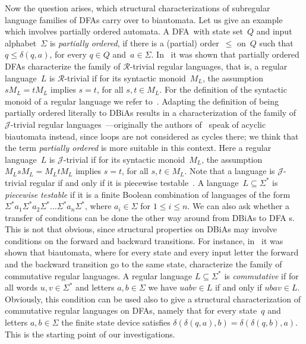\documentclass[submission]{eptcs}
\newcommand{\dfa}{\textrm{DFA}}
\newcommand{\dbia}{\textrm{DBiA}}
\begin{document}
Now the question arises, which structural characterizations of
subregular language families of \dfa s carry over to biautomata. Let
us give an example which involves partially ordered automata. A \dfa\
with state set~$Q$ and input alphabet~$\Sigma$ is \emph{partially
  ordered}, if there is a (partial) order~$\leq$ on~$Q$ such that
$q\leq \delta(q,a)$, for every $q\in Q$
and~$a\in\Sigma$. In~\cite{BrFi80} it was shown that partially ordered
\dfa s characterize the family of $\mathcal{R}$-trivial regular
languages, that is, a regular language~$L$ is $\mathcal{R}$-trivial if
for its syntactic monoid~$M_L$, the assumption $sM_L=tM_L$ implies
$s=t$, for all $s,t\in M_L$. For the definition of the syntactic
monoid of a regular language we refer to~\cite{Ar69}. Adapting the
definition of being partially ordered literally to \dbia s results in
a characterization of the family of $\mathcal{J}$-trivial regular
languages~\cite{KlPo12a,KlPo12}---originally the authors
of~\cite{KlPo12} speak of acyclic biautomata instead, since loops are
not considered as cycles there; we think that the term \emph{partially
  ordered} is more suitable in this context. Here a regular
language~$L$ is $\mathcal{J}$-trivial if for its syntactic
monoid~$M_L$, the assumption $M_LsM_L=M_LtM_L$ implies $s=t$, for all
$s,t\in M_L$. Note that a language is $\mathcal{J}$-trivial regular if
and only if it is piecewise testable~\cite{Si75}. A
language~$L\subseteq\Sigma^*$ is \emph{piecewise testable} if it is a
finite Boolean combination of languages of the form
$\Sigma^*a_1\Sigma^*a_2\Sigma^*\ldots\Sigma^*a_n\Sigma^*$, where
$a_i\in\Sigma$ for $1\leq i\leq n$. We can also ask whether a transfer
of conditions can be done the other way around from \dbia s to \dfa
s. This is not that obvious, since structural properties on \dbia s
may involve conditions on the forward and backward transitions. For
instance, in~\cite{HoJa13c} it was shown that biautomata, where for
every state and every input letter the forward and the backward
transition go to the same state, characterize the family of
commutative regular languages. A regular language $L\subseteq\Sigma^*$
is \emph{commutative} if for all words $u,v\in\Sigma^*$ and letters
$a,b\in\Sigma$ we have $uabv\in L$ if and only if $ubav\in
L$. Obviously, this condition can be used also to give a structural
characterization of commutative regular languages on \dfa s, namely
that for every state~$q$ and letters $a,b\in\Sigma$ the finite state
device satisfies $\delta(\delta(q,a),b)=\delta(\delta(q,b),a)$. This
is the starting point of our investigations.
\end{document}
